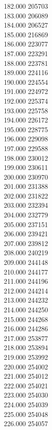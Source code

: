 { 182.000	205703 \\
 183.000	206089 \\
 184.000	206527 \\
 185.000	216869 \\
 186.000	223077 \\
 187.000	223291 \\
 188.000	223781 \\
 189.000	224116 \\
 190.000	224554 \\
 191.000	224972 \\
 192.000	225374 \\
 193.000	225758 \\
 194.000	226172 \\
 195.000	228775 \\
 196.000	229098 \\
 197.000	229588 \\
 198.000	230012 \\
 199.000	230611 \\
 200.000	230970 \\
 201.000	231388 \\
 202.000	231822 \\
 203.000	232394 \\
 204.000	232779 \\
 205.000	237151 \\
 206.000	239421 \\
 207.000	239812 \\
 208.000	240219 \\
 209.000	244148 \\
 210.000	244177 \\
 211.000	244196 \\
 212.000	244214 \\
 213.000	244232 \\
 214.000	244250 \\
 215.000	244268 \\
 216.000	244286 \\
 217.000	253877 \\
 218.000	253894 \\
 219.000	253992 \\
 220.000	254002 \\
 221.000	254012 \\
 222.000	254021 \\
 223.000	254030 \\
 224.000	254039 \\
 225.000	254048 \\
 226.000	254057 \\
}
